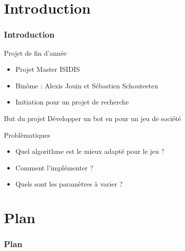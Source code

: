 \section*{Introduction}
	\begin{frame}
		\frametitle{Introduction}
		
		\begin{block}{Projet de fin d'année}
			\begin{itemize}
			\item Projet Master ISIDIS
			\item Binôme : Alexis Jouin et Sébastien Schouteeten
			\item Initiation pour un projet de recherche	
			\end{itemize}
		\end{block}
	
		\begin{block}{But du projet}		
			Développer un bot en \java pour un jeu de société \himalaya		
		\end{block}
	
		\begin{alertblock}{Problèmatiques}
			\begin{itemize}
				\item Quel algorithme est le mieux adapté pour le jeu \himalaya ?
				\item Comment l'implémenter ?
				\item Quels sont les paramètres à varier ?
			\end{itemize}
		\end{alertblock}
	
	\end{frame}
	
	
\section*{Plan}
	\begin{frame} 
		\frametitle{Plan}
		\tableofcontents
	\end{frame}